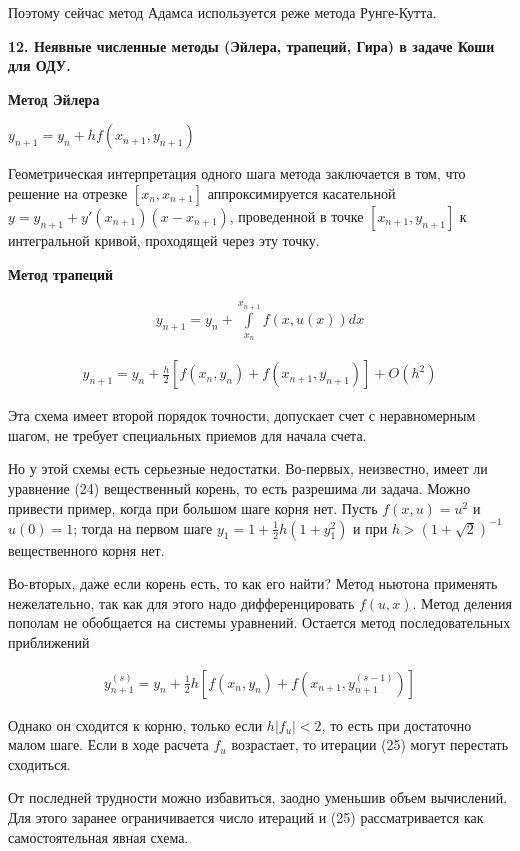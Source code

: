 \documentclass[a4paper,14pt]{article}
\begin{document}
Поэтому сейчас метод Адамса используется реже метода Рунге-Кутта.

\textbf{12. Неявные численные методы (Эйлера, трапеций,  Гира) в задаче Коши для ОДУ.}

\textbf{Метод Эйлера}

$y_{n+1} = y_n + h f(x_{n+1}, y_{n+1})$

Геометрическая интерпретация одного шага метода заключается в том, что 
решение на отрезке $[x_n, x_{n+1}]$ аппроксимируется касательной
$y = y_{n+1} + y'(x_{n+1}) (x - x_{n+1})$, проведенной в точке
$[x_{n+1}, y_{n+1}]$ к интегральной кривой, проходящей через эту точку.

\textbf{Метод трапеций}

\begin{eqnarray}
	y_{n+1} = y_n + \int\limits_{x_n}^{x_{n+1}} f(x, u(x)) dx
\end{eqnarray}

\begin{eqnarray}
	y_{n+1} = y_n + \frac{h}{2} \left[ f(x_n, y_n) + f(x_{n+1}, y_{n+1}) \right] + O(h^2)
\end{eqnarray}

Эта схема имеет второй порядок точности, допускает счет с неравномерным
шагом, не требует специальных приемов для начала счета.

Но у этой схемы есть серьезные недостатки. Во-первых, неизвестно, имеет ли уравнение (24)
вещественный корень, то есть разрешима ли задача. Можно привести пример, когда
при большом шаге корня нет. Пусть $f(x, u) = u^2$ и $u(0) = 1$;
тогда на первом шаге $y_1 =  1 + \frac{1}{2} h (1 + y_1^2)$ 
и при $h > (1 + \sqrt{2})^{-1}$ вещественного корня нет.

Во-вторых, даже если корень есть, то как его найти? Метод ньютона применять 
нежелательно, так как для этого надо дифференцировать $f(u, x)$. Метод 
деления пополам не обобщается на системы уравнений. Остается метод 
последовательных приближений 

\begin{eqnarray}
	y_{n+1}^{(s)} = y_n + \frac{1}{2} h [f(x_n, y_n) + f(x_{n+1}, y_{n+1}^{(s-1)})]
\end{eqnarray}

Однако он сходится к корню, только если $h |f_u| < 2$, то есть 
при достаточно малом шаге. Если в ходе расчета $f_u$ возрастает, то итерации
(25) могут перестать сходиться. 

От последней трудности можно избавиться, заодно уменьшив объем вычислений. Для этого 
заранее ограничивается число итераций и (25) рассматривается как самостоятельная 
явная схема.
\end{document}
